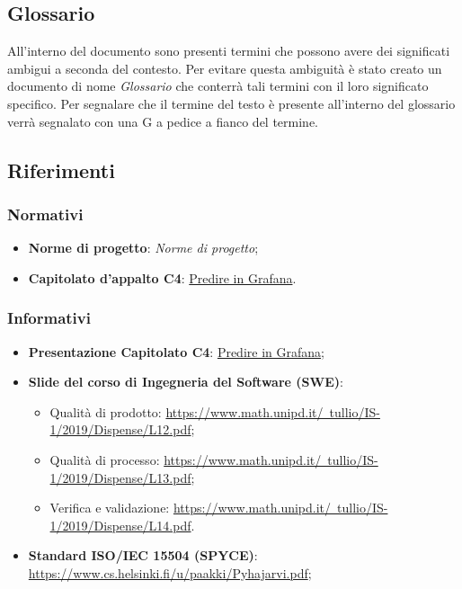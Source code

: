 \documentclass{article}
\begin{document}
\subsection{Glossario}%
\label{sub:glossario}
All'interno del documento sono presenti termini che possono avere dei significati ambigui a seconda del contesto. Per evitare questa ambiguità è stato creato un documento di nome \textit{Glossario} che conterrà tali termini con il loro significato specifico. Per segnalare che il termine del testo è presente all'interno del glossario verrà segnalato con una G a pedice a fianco del termine.

\subsection{Riferimenti}%
\label{sub:riferimenti}

\subsubsection{Normativi}%
\label{subs:normativi}
\begin{itemize}
    \item \textbf{Norme di progetto}: \textit{Norme di progetto};
    \item \textbf{Capitolato d'appalto C4}: \href{https://www.math.unipd.it/~tullio/IS-1/2019/Progetto/C4.pdf}{Predire in Grafana}.
\end{itemize}

\subsubsection{Informativi}%
\label{subs:informativi}
\begin{itemize}
    \item \textbf{Presentazione Capitolato C4}: \href{https://www.math.unipd.it/~tullio/IS-1/2019/Dispense/C4a.pdf}{Predire in Grafana};
    \item \textbf{Slide del corso di Ingegneria del Software (SWE)}:
    \begin{itemize}
        \item Qualità di prodotto: \href{https://www.math.unipd.it/~tullio/IS-1/2019/Dispense/L12.pdf}{https://www.math.unipd.it/~tullio/IS-1/2019/Dispense/L12.pdf};
        \item Qualità di processo: \href{https://www.math.unipd.it/~tullio/IS-1/2019/Dispense/L13.pdf}{https://www.math.unipd.it/~tullio/IS-1/2019/Dispense/L13.pdf};
        \item Verifica e validazione: \href{https://www.math.unipd.it/~tullio/IS-1/2019/Dispense/L14.pdf}{https://www.math.unipd.it/~tullio/IS-1/2019/Dispense/L14.pdf}.
    \end{itemize}
    \item \textbf{Standard ISO/IEC 15504 (SPYCE)}: \href{https://www.cs.helsinki.fi/u/paakki/Pyhajarvi.pdf}{https://www.cs.helsinki.fi/u/paakki/Pyhajarvi.pdf};
\end{itemize}
\end{document}
